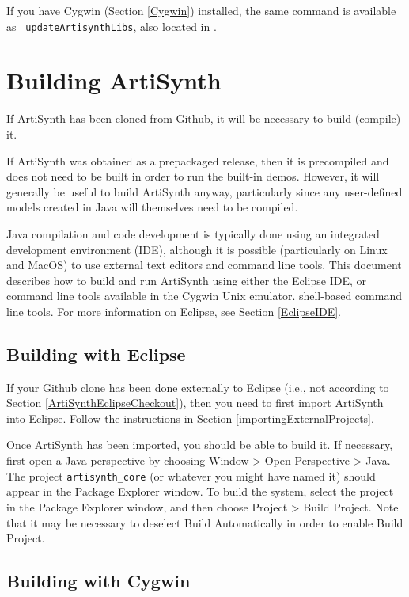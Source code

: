 \ifWindows
If you have Cygwin (Section \ref{Cygwin}) installed, 
the same command is available as {\tt
updateArtisynthLibs}, also located in .
\else\fi

\section{Building ArtiSynth}
\label{Building}

If ArtiSynth has been cloned from Github, it will be necessary to
build (compile) it. 

If ArtiSynth was obtained as a prepackaged release, then it is
precompiled and does not need to be built in order to run the built-in
demos. However, it will generally be useful to build ArtiSynth anyway,
particularly since any user-defined models created in Java will
themselves need to be compiled.

Java compilation and code development is typically done using an
integrated development environment (IDE), although it is possible
(particularly on Linux and MacOS) to use external text editors and
command line tools. This document describes how to build and run
ArtiSynth using either the Eclipse IDE, or
\ifWindows
command line tools available in the Cygwin Unix emulator.
\else
shell-based command line tools.
\fi
For more information on Eclipse, see Section \ref{EclipseIDE}.

\subsection{Building with Eclipse}
\label{BuildingWithEclipse}

If your Github clone has been done externally to Eclipse (i.e.,
not according to Section \ref{ArtiSynthEclipseCheckout}), then you
need to first import ArtiSynth into Eclipse. Follow the instructions
in Section \ref{importingExternalProjects}.

Once ArtiSynth has been imported, you should be able to build it.  If
necessary, first open a Java perspective by choosing {\sf Window >
Open Perspective > Java}. The project {\tt artisynth\_core} (or
whatever you might have named it) should appear in the {\sf Package
Explorer} window. To build the system, select the project in the {\sf
Package Explorer} window, and then choose {\sf Project > Build
Project}. Note that it may be necessary to deselect {\sf Build
Automatically} in order to enable {\sf Build Project}.

\ifWindows
\subsection{Building with Cygwin}
\label{BuildingWithCygwin}

